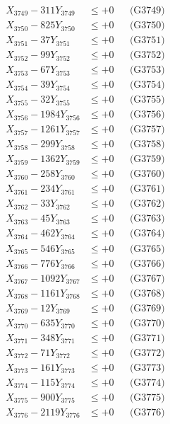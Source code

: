 \documentclass[a4paper,10pt]{article}
\begin{document}
{\begin{align}
X_{3749} - 311Y_{3749} &\leq +0 && \text{(G3749)} \\
X_{3750} - 825Y_{3750} &\leq +0 && \text{(G3750)} \\
\allowbreak
X_{3751} - 37Y_{3751} &\leq +0 && \text{(G3751)} \\
X_{3752} - 99Y_{3752} &\leq +0 && \text{(G3752)} \\
X_{3753} - 67Y_{3753} &\leq +0 && \text{(G3753)} \\
X_{3754} - 39Y_{3754} &\leq +0 && \text{(G3754)} \\
X_{3755} - 32Y_{3755} &\leq +0 && \text{(G3755)} \\
X_{3756} - 1984Y_{3756} &\leq +0 && \text{(G3756)} \\
X_{3757} - 1261Y_{3757} &\leq +0 && \text{(G3757)} \\
X_{3758} - 299Y_{3758} &\leq +0 && \text{(G3758)} \\
X_{3759} - 1362Y_{3759} &\leq +0 && \text{(G3759)} \\
X_{3760} - 258Y_{3760} &\leq +0 && \text{(G3760)} \\
\allowbreak
X_{3761} - 234Y_{3761} &\leq +0 && \text{(G3761)} \\
X_{3762} - 33Y_{3762} &\leq +0 && \text{(G3762)} \\
X_{3763} - 45Y_{3763} &\leq +0 && \text{(G3763)} \\
X_{3764} - 462Y_{3764} &\leq +0 && \text{(G3764)} \\
X_{3765} - 546Y_{3765} &\leq +0 && \text{(G3765)} \\
X_{3766} - 776Y_{3766} &\leq +0 && \text{(G3766)} \\
X_{3767} - 1092Y_{3767} &\leq +0 && \text{(G3767)} \\
X_{3768} - 1161Y_{3768} &\leq +0 && \text{(G3768)} \\
X_{3769} - 12Y_{3769} &\leq +0 && \text{(G3769)} \\
X_{3770} - 635Y_{3770} &\leq +0 && \text{(G3770)} \\
\allowbreak
X_{3771} - 348Y_{3771} &\leq +0 && \text{(G3771)} \\
X_{3772} - 71Y_{3772} &\leq +0 && \text{(G3772)} \\
X_{3773} - 161Y_{3773} &\leq +0 && \text{(G3773)} \\
X_{3774} - 115Y_{3774} &\leq +0 && \text{(G3774)} \\
X_{3775} - 900Y_{3775} &\leq +0 && \text{(G3775)} \\
X_{3776} - 2119Y_{3776} &\leq +0 && \text{(G3776)} \\

\end{align}}
\end{document}
